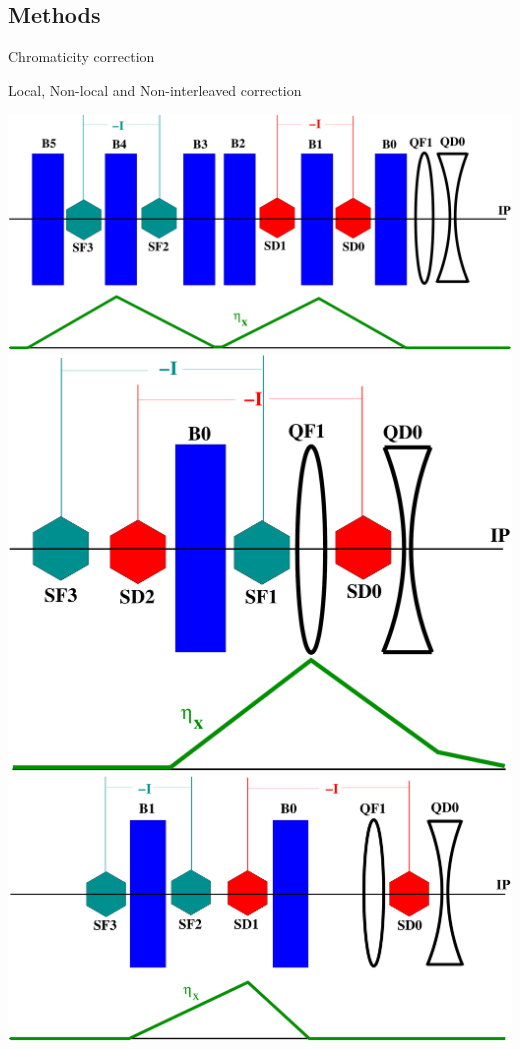 \documentclass{beamer}
\begin{document}
\subsection{Methods}
\begin{frame}
 \color{blue}\Large Chromaticity correction
\end{frame}
\begin{frame}{Local, Non-local and Non-interleaved correction}
\raggedright
  \includegraphics[scale=0.12,angle=0]{nonlocalcorr.pdf}\hspace*{0.5cm}\includegraphics[scale=0.12,angle=0]{localcorr.pdf}\\
  \vspace*{0.5cm}
\centering
\includegraphics[scale=0.15,angle=0]{noninterleavedcorr.pdf}\\

\end{frame}
\end{document}
